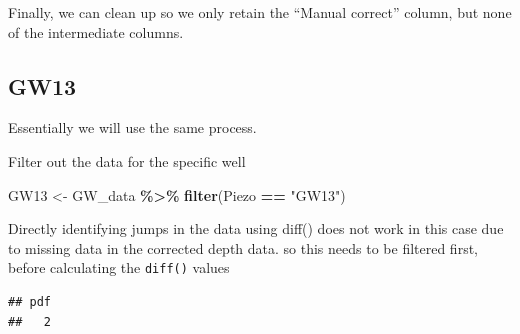 \documentclass[
]{article}
\newenvironment{Shaded}{\begin{snugshade}}{\end{snugshade}}
\newcommand{\AttributeTok}[1]{\textcolor[rgb]{0.13,0.29,0.53}{#1}}
\newcommand{\CommentTok}[1]{\textcolor[rgb]{0.56,0.35,0.01}{\textit{#1}}}
\newcommand{\DecValTok}[1]{\textcolor[rgb]{0.00,0.00,0.81}{#1}}
\newcommand{\FunctionTok}[1]{\textcolor[rgb]{0.13,0.29,0.53}{\textbf{#1}}}
\newcommand{\NormalTok}[1]{#1}
\newcommand{\OtherTok}[1]{\textcolor[rgb]{0.56,0.35,0.01}{#1}}
\newcommand{\SpecialCharTok}[1]{\textcolor[rgb]{0.81,0.36,0.00}{\textbf{#1}}}
\newcommand{\StringTok}[1]{\textcolor[rgb]{0.31,0.60,0.02}{#1}}
\begin{document}
Finally, we can clean up so we only retain the ``Manual correct''
column, but none of the intermediate columns.

\subsection{GW13}\label{gw13}

Essentially we will use the same process.

Filter out the data for the specific well

\begin{Shaded}
\begin{Highlighting}[]
\NormalTok{GW13 }\OtherTok{\textless{}{-}}\NormalTok{ GW\_data }\SpecialCharTok{\%\textgreater{}\%}
  \FunctionTok{filter}\NormalTok{(Piezo }\SpecialCharTok{==} \StringTok{"GW13"}\NormalTok{)}
\end{Highlighting}
\end{Shaded}

Directly identifying jumps in the data using diff() does not work in
this case due to missing data in the corrected depth data. so this needs
to be filtered first, before calculating the \texttt{diff()} values

\begin{Shaded}
\end{Shaded}

\begin{verbatim}
## pdf 
##   2
\end{verbatim}
\end{document}
